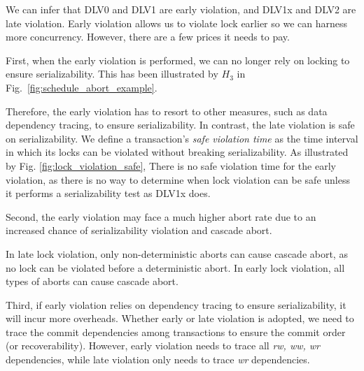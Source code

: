 \documentclass[conference]{IEEEtran}
\begin{document}
We can infer that DLV0 and DLV1 are early violation, and DLV1x and DLV2 are late violation.
Early violation allows us to violate lock earlier so we can harness more concurrency. However, there are a few prices it needs to pay.

First, when the early violation is performed, we can no longer rely on locking to ensure serializability. This has been illustrated by ${H_3}$ in Fig.~\ref{fig:schedule_abort_example}.

Therefore, the early violation has to resort to other measures, such as data dependency tracing, to ensure serializability.
In contrast, the late violation is safe on serializability.
We define a transaction's \emph{safe violation time} as the time interval in which its locks can be violated without breaking serializability.
As illustrated by Fig. \ref{fig:lock_violation_safe},
There is no safe violation time for the early violation, as there is no way to determine when lock violation can be safe unless it performs a serializability test as DLV1x does.


Second, the early violation may face a much higher abort rate due to an increased chance of serializability violation and cascade abort.

In late lock violation, only non-deterministic aborts can cause cascade abort, as no lock can be violated before a deterministic abort.
In early lock violation, all types of aborts can cause cascade abort.

Third, if early violation relies on dependency tracing to ensure serializability, it will incur more overheads.
Whether early or late violation is adopted, we need to trace the commit dependencies among transactions to ensure the commit order (or recoverability).
However, early violation needs to trace all \emph{rw, ww, wr} dependencies, while late violation only needs to trace \emph{wr} dependencies.

\end{document}
